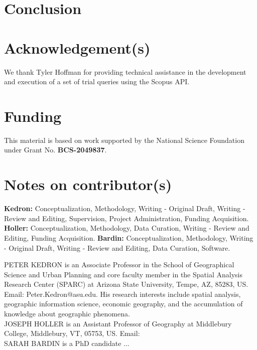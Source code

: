 \documentclass[]{interact}
\theoremstyle{plain}%
\theoremstyle{definition}
\theoremstyle{remark}
\begin{document}
\section*{Conclusion}


\theendnotes


\section*{Acknowledgement(s)}
We thank Tyler Hoffman for providing technical assistance in the development and execution of a set of trial queries using the Scopus API.

\section*{Funding}
This material is based on work supported by the National Science Foundation under Grant No. \textbf{BCS-2049837}.

\section*{Notes on contributor(s)}
\textbf{Kedron:} Conceptualization, Methodology, Writing - Original Draft, Writing - Review and Editing, Supervision, Project Administration, Funding Acquisition. \textbf{Holler:} Conceptualization, Methodology, Data Curation, Writing - Review and Editing, Funding Acquisition. \textbf{Bardin:} Conceptualization, Methodology, Writing - Original Draft, Writing - Review and Editing, Data Curation, Software.



\newpage


\newpage
\noindent PETER KEDRON is an Associate Professor in the School of Geographical Science and Urban Planning and core faculty member in the Spatial Analysis Research Center (SPARC) at Arizona State University, Tempe, AZ, 85283, US. Email: Peter.Kedron@asu.edu. His research interests include spatial analysis, geographic information science, economic geography, and the accumulation of knowledge about geographic phenomena. \\  
  
\noindent JOSEPH HOLLER is an Assistant Professor of Geography at Middlebury College, Middlebury, VT, 05753, US. Email: \\
  
\noindent SARAH BARDIN is a PhD candidate ...
\end{document}
